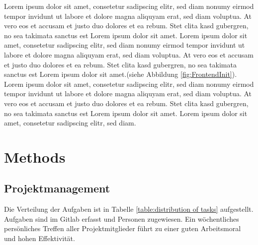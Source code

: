 \documentclass[a4paper]{spie}  %
\begin{document}
Lorem ipsum dolor sit amet, consetetur sadipscing elitr, sed diam nonumy eirmod tempor invidunt ut labore et dolore magna aliquyam erat, sed diam voluptua. At vero eos et accusam et justo duo dolores et ea rebum. Stet clita kasd gubergren, no sea takimata sanctus est Lorem ipsum dolor sit amet. Lorem ipsum dolor sit amet, consetetur sadipscing elitr, sed diam nonumy eirmod tempor invidunt ut labore et dolore magna aliquyam erat, sed diam voluptua. At vero eos et accusam et justo duo dolores et ea rebum. Stet clita kasd gubergren, no sea takimata sanctus est Lorem ipsum dolor sit amet.(siehe Abbildung \ref{fig:FrontendInit}).
\\
Lorem ipsum dolor sit amet, consetetur sadipscing elitr, sed diam nonumy eirmod tempor invidunt ut labore et dolore magna aliquyam erat, sed diam voluptua. At vero eos et accusam et justo duo dolores et ea rebum. Stet clita kasd gubergren, no sea takimata sanctus est Lorem ipsum dolor sit amet. Lorem ipsum dolor sit amet, consetetur sadipscing elitr, sed diam.

\section{Methods}
\subsection{Projektmanagement}
Die Verteilung der Aufgaben ist in Tabelle \ref{table:distribution of tasks} aufgestellt.
Aufgaben sind im Gitlab erfasst und Personen zugewiesen. Ein wöchentliches persönliches Treffen aller Projektmitglieder führt zu einer guten Arbeitsmoral und hohen Effektivität.
\end{document}
